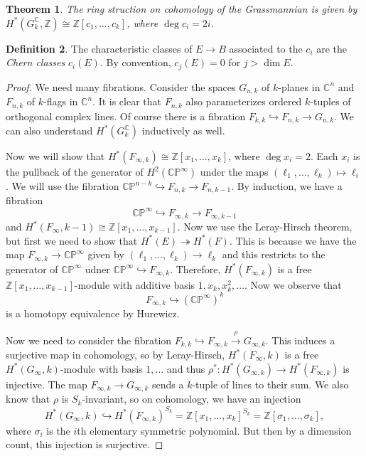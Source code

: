 \documentclass[leqno, openany]{memoir}
\newtheorem{thm}{Theorem}[section]
\theoremstyle{definition}
\newtheorem{defn}[thm]{Definition}
\theoremstyle{remark}
\theoremstyle{plain}
\theoremstyle{definition}
\theoremstyle{remark}
\newcommand{\C}{\mathbb{C}}
\newcommand{\Z}{\mathbb{Z}}
\renewcommand{\P}{\mathbb{P}}
\begin{document}
\begin{thm}
    The ring struction on cohomology of the Grassmannian is given by $H^*(G_k^{\C}, \Z) \cong \Z[c_1, \ldots, c_k]$, where $\deg c_i = 2i$.
\end{thm}

\begin{defn}
    The characteristic classes of $E \to B$ associated to the $c_i$ are the \textit{Chern classes} $c_i(E)$. By convention, $c_j(E) = 0$ for $j > \dim E$.  
\end{defn}

\begin{proof}
    We need many fibrations. Consider the spaces $G_{n,k}$ of $k$-planes in $\C^n$ and $F_{n,k}$ of $k$-flags in $\C^n$. It is clear that $F_{n,k}$ also parameterizes ordered $k$-tuples of orthogonal complex lines. Of course there is a fibration $F_{k, k} \hookrightarrow F_{n,k} \to G_{n,k}$. We can also understand $H^*(G_k^{\C})$ inductively as well.

    Now we will show that $H^*(F_{\infty,k}) \cong \Z[x_1, \ldots, x_k]$, where $\deg x_i = 2$. Each $x_i$ is the pullback of the generator of $H^2(\C\P^{\infty})$ under the maps $(\ell_1, \ldots, \ell_k) \mapsto \ell_i$. We will use the fibration $\C\P^{n-k} \hookrightarrow F_{n,k} \to F_{n,k-1}$. By induction, we have a fibration
    \[ \C\P^{\infty} \hookrightarrow F_{\infty, k} \to F_{\infty, k-1} \]
    and $H^*(F_{\infty}, k-1) \cong \Z[x_1, \ldots, x_{k-1}]$. Now we use the Leray-Hirsch theorem, but first we need to show that $H^*(E) \twoheadrightarrow H^*(F)$. This is because we have the map $F_{\infty, k} \to \C\P^{\infty}$ given by $(\ell_1, \ldots, \ell_k) \to \ell_k$ and this restricts to the generator of $\C\P^{\infty}$ udner $\C\P^{\infty} \hookrightarrow F_{\infty, k}$. Therefore, $H^*(F_{\infty,k})$ is a free $\Z[x_1, \ldots, x_{k-1}]$-module with additive basis $1, x_k, x_k^2, \ldots$. Now we observe that 
    \[ F_{\infty, k} \hookrightarrow {(\C\P^{\infty})}^k \]
    is a homotopy equivalence by Hurewicz.

    Now we need to consider the fibration $F_{k,k} \hookrightarrow F_{\infty, k} \xrightarrow{\rho} G_{\infty, k}$. This induces a surjective map in cohomology, so by Leray-Hirsch, $H^*(F_{\infty}, k)$ is a free $H^*(G_{\infty}, k)$-module with basis $1, \ldots$ and thus $\rho^* \colon H^*(G_{\infty, k}) \to H^*(F_{\infty, k})$ is injective. The map $F_{\infty, k} \to G_{\infty, k}$ sends a $k$-tuple of lines to their sum. We also know that $\rho$ is $S_k$-invariant, so on cohomology, we have an injection
    \[ H^*(G_{\infty}, k) \hookrightarrow {H^*(F_{\infty,k})}^{S_k} = {\Z[x_1, \ldots, x_k]}^{S_k} = \Z[\sigma_1, \ldots, \sigma_k], \]
    where $\sigma_i$ is the $i$th elementary symmetric polynomial. But then by a dimension count, this injection is surjective.
\end{proof}
\end{document}
